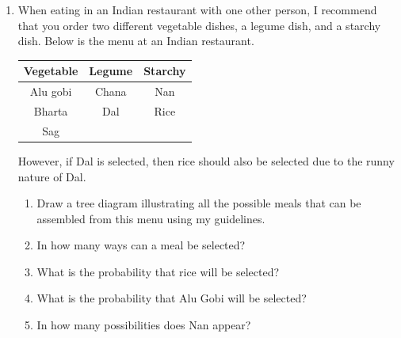 \documentclass[11pt]{article}
\begin{document}
\begin{enumerate}
\item When eating in an Indian restaurant with one other person,
I recommend that you order two different vegetable dishes,
a legume dish, and a starchy
dish. Below is the menu at an Indian restaurant.
\begin{center}\begin{tabular}{c|c|c}
\bf Vegetable&\bf Legume&\bf Starchy\\\hline
Alu gobi&Chana&Nan\\
Bharta&Dal&Rice\\
Sag
\end{tabular}\end{center}
However, if Dal is selected, then rice should also be selected
due to the runny nature of Dal.
\begin{enumerate}
\item Draw a tree diagram illustrating all the
possible meals that can be assembled from this
menu using my guidelines.
\item In how many ways can a meal be selected?
\item What is the probability that rice will be selected?
\item What is the probability that Alu Gobi will be selected?
\item In how many possibilities does Nan appear?
\end{enumerate}
\end{enumerate}
\end{document}
